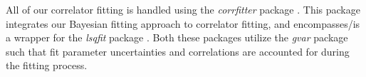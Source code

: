 All of our correlator fitting is handled using the \textit{corrfitter} package \cite{peter_lepage_2021_5733391}.  This package integrates our Bayesian fitting approach to correlator fitting, and encompasses/is a wrapper for the \textit{lsqfit} package \cite{peter_lepage_2024_12690493}.  Both these packages utilize the \textit{gvar} package such that fit parameter uncertainties and correlations are accounted for during the fitting process.




